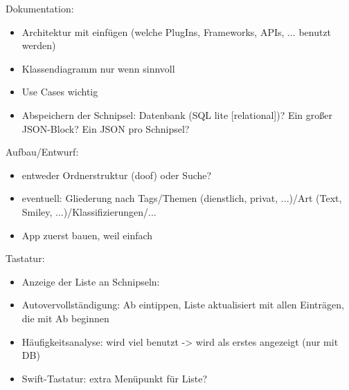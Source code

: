 \documentclass[11pt]{article}
\begin{document}
	Dokumentation:
	\begin{itemize}
		\item Architektur mit einfügen (welche PlugIns, Frameworks, APIs, ... benutzt werden)
		\item Klassendiagramm nur wenn sinnvoll
		\item Use Cases wichtig
		\item Abspeichern der Schnipsel: Datenbank (SQL lite [relational])? Ein großer JSON-Block? Ein JSON pro Schnipsel?
	\end{itemize}	
	Aufbau/Entwurf:
	\begin{itemize}
		\item entweder Ordnerstruktur (doof) oder Suche? 
		\item eventuell: Gliederung nach Tags/Themen (dienstlich, privat, ...)/Art (Text, Smiley, ...)/Klassifizierungen/...
		\item App zuerst bauen, weil einfach
	\end{itemize}
	Tastatur:
	\begin{itemize}
		\item Anzeige der Liste an Schnipseln: 
		\item Autovervollständigung: Ab eintippen, Liste aktualisiert mit allen Einträgen, die mit Ab beginnen
		\item Häufigkeitsanalyse: wird viel benutzt -> wird als erstes angezeigt (nur mit DB)
		\item Swift-Tastatur: extra Menüpunkt für Liste?
	\end{itemize}


\end{document}
